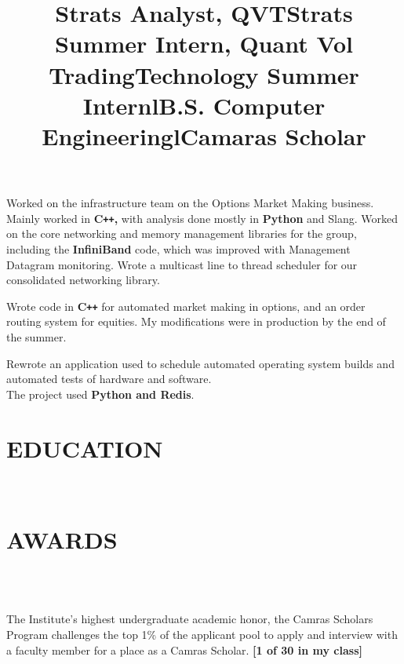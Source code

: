 \documentclass{res}
\begin{document}
\begin{resume}
\title{\bf Strats Analyst, QVT}
\begin{position}
	Worked on the infrastructure team on the Options Market Making business. Mainly worked in {\bf C\texttt{++}, } with analysis done mostly in {\bf Python }and Slang.
	Worked on the core networking and memory management libraries for the group, including the {\bf InfiniBand} code, which was improved with Management Datagram monitoring. Wrote a multicast line to thread scheduler for our consolidated networking library.
\end{position}

\title{\bf Strats Summer Intern, Quant Vol Trading}
\begin{position}
     Wrote code in {\bf C\texttt{++}} for automated market making in options, and an order routing system for equities. My modifications were in production by the end of the summer.
\end{position}

\title{\bf Technology Summer Intern}
\begin{position}
     Rewrote an application used to schedule automated operating system builds and automated tests of hardware and software.\\
     The project used {\bf Python and Redis}.
\end{position}

\section{EDUCATION}

\begin{format}
  \title{l}  \\
\end{format}
\title{B.S. Computer Engineering}
\begin{position}
\end{position}

\section{AWARDS}
\begin{format}
  \title{l} \\
  \body\\
\end{format}
\title{\bf Camaras Scholar}
\dates{}
\begin{position}
        The Institute's highest undergraduate academic honor, the Camras Scholars Program challenges the top 1\% of the applicant pool to apply and interview with a faculty member for a place as a Camras Scholar. {\bf [1 of 30 in my class]}
\end{position}


\end{resume}
\end{document}
